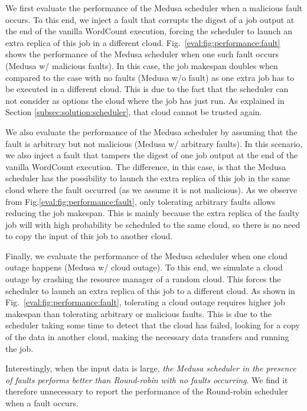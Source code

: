 \documentclass[10pt, conference, compsocconf]{IEEEtran}
\begin{document}
We first evaluate the performance of the Medusa scheduler when a malicious fault occurs.
To this end, we inject a fault that corrupts the digest of a job output at the end of the vanilla WordCount execution, forcing the scheduler to launch an extra replica of this job in a different cloud.
Fig.~\ref{eval:fig:performance:fault} shows the performance of the Medusa scheduler when one such fault occurs (Medusa w/ malicious faults).
In this case, the job makespan doubles when compared to the case with no faults (Medusa w/o fault) as one extra job has to be executed in a different cloud.
This is due to the fact that the scheduler can not consider as options the cloud where the job has just run.
As explained in Section \ref{subsec:solution:scheduler}, that cloud cannot be trusted again.

We also evaluate the performance of the Medusa scheduler by assuming that the fault is arbitrary but not malicious (Medusa w/ arbitrary faults).
In this scenario, we also inject a fault that tampers the digest of one job output at the end of the vanilla WordCount execution.
The difference, in this case, is that the Medusa scheduler has the possibility to launch the extra replica of this job in the same cloud where the fault occurred (as we assume it is not malicious).
As we observe from Fig.\ref{eval:fig:performance:fault}, only tolerating arbitrary faults allows reducing the job makespan.
This is mainly because the extra replica of the faulty job will with high probability be scheduled to the same cloud, so there is no need to copy the input of this job to another cloud.

Finally, we evaluate the performance of the Medusa scheduler when one cloud outage happens (Medusa w/ cloud outage).
To this end, we simulate a cloud outage by crashing the resource manager of a random cloud.
This forces the scheduler to launch an extra replica of this job to a different cloud.
As shown in Fig.~\ref{eval:fig:performance:fault}, tolerating a cloud outage requires higher job makespan than tolerating arbitrary or malicious faults.
This is due to the scheduler taking some time to detect that the cloud has failed, looking for a copy of the data in another cloud, making the necessary data transfers and running the job.

Interestingly, when the input data is large, \emph{the Medusa scheduler in the presence of faults performs better than Round-robin with no faults occurring}.
We find it therefore unnecessary to report the performance of the Round-robin scheduler when a fault occurs.
\end{document}
